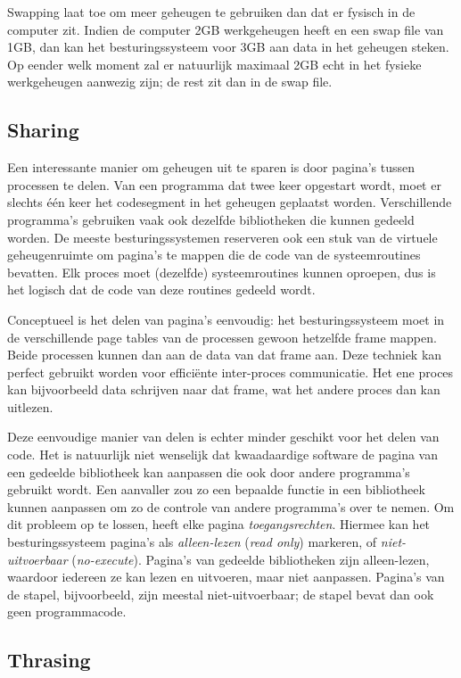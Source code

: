 Swapping laat toe om meer geheugen te gebruiken dan dat er fysisch in de computer zit. Indien de computer 2GB werkgeheugen heeft en een swap file van 1GB, dan kan het besturingssysteem voor 3GB aan data in het geheugen steken. Op eender welk moment zal er natuurlijk maximaal 2GB echt in het fysieke werkgeheugen aanwezig zijn; de rest zit dan in de swap file.

\subsection{Sharing}

Een interessante manier om geheugen uit te sparen is door pagina's tussen processen te delen. Van een programma dat twee keer opgestart wordt, moet er slechts \'e\'en keer het codesegment in het geheugen geplaatst worden. Verschillende programma's gebruiken vaak ook dezelfde bibliotheken die kunnen gedeeld worden. De meeste besturingssystemen reserveren ook een stuk van de virtuele geheugenruimte om pagina's te mappen die de code van de systeemroutines bevatten. Elk proces moet (dezelfde) systeemroutines kunnen oproepen, dus is het logisch dat de code van deze routines gedeeld wordt.

Conceptueel is het delen van pagina's eenvoudig: het besturingssysteem moet in de verschillende page tables van de processen gewoon hetzelfde frame mappen. Beide processen kunnen dan aan de data van dat frame aan. Deze techniek kan perfect gebruikt worden voor effici\"ente inter-proces communicatie. Het ene proces kan bijvoorbeeld data schrijven naar dat frame, wat het andere proces dan kan uitlezen.

Deze eenvoudige manier van delen is echter minder geschikt voor het delen van code. Het is natuurlijk niet wenselijk dat kwaadaardige software de pagina van een gedeelde bibliotheek kan aanpassen die ook door andere programma's gebruikt wordt. Een aanvaller zou zo een bepaalde functie in een bibliotheek kunnen aanpassen om zo de controle van andere programma's over te nemen. Om dit probleem op te lossen, heeft elke pagina \emph{toegangsrechten}. Hiermee kan het besturingssysteem pagina's als \emph{alleen-lezen} (\emph{read only}) markeren, of \emph{niet-uitvoerbaar} (\emph{no-execute}). Pagina's van gedeelde bibliotheken zijn alleen-lezen, waardoor iedereen ze kan lezen en uitvoeren, maar niet aanpassen. Pagina's van de stapel, bijvoorbeeld, zijn meestal niet-uitvoerbaar; de stapel bevat dan ook geen programmacode.

\subsection{Thrasing}

